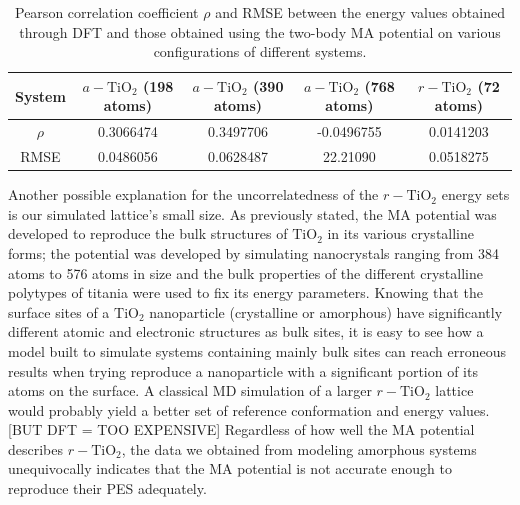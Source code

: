 \documentclass[aps,prb,twocolumn,amsmath,amssymb,superscriptaddress,longbibliography]{revtex4-1}
\newcommand\tab[1][1cm]{\hspace*{#1}} %
\begin{document}
\begin{table}[]
\begin{tabular}{c|c|c|c|c}
System & $a-\text{TiO}_2$ (198 atoms) & $a-\text{TiO}_2$ (390 atoms) & $a-\text{TiO}_2$ (768 atoms)  & $r-\text{TiO}_2$ (72 atoms) \\ \hline
$\rho$ & 0.3066474                    & 0.3497706                    & -0.0496755                   & 0.0141203                   \\
RMSE   & 0.0486056                    & 0.0628487                    & 22.21090                       & 0.0518275                   \\
\end{tabular}
\label{stats}
\caption{Pearson correlation coefficient $\rho$ and RMSE between the energy values obtained through DFT and those obtained using the two-body MA potential on various configurations of different systems.}
\end{table}

\tab Another possible explanation for the uncorrelatedness of the $r-\text{TiO}_2$ energy sets is our simulated lattice's small size.
As previously stated, the MA potential was developed to reproduce the bulk structures of $\text{TiO}_2$ in its various crystalline forms; the potential was developed by simulating nanocrystals ranging from 384 atoms to 576 atoms in size and the bulk properties of the different crystalline polytypes of titania were used to fix its energy parameters.
Knowing that the surface sites of a $\text{TiO}_2$ nanoparticle (crystalline or amorphous) have significantly different atomic and electronic structures as bulk sites\cite{vvh1,realistic_nnp,vvh2}, it is easy to see how a model built to simulate systems containing mainly bulk sites can reach erroneous results when trying reproduce a nanoparticle with a significant portion of its atoms on the surface.
A classical MD simulation of a larger $r-\text{TiO}_2$ lattice would probably yield a better set of reference conformation and energy values.
[BUT DFT = TOO EXPENSIVE]
Regardless of how well the MA potential describes $r-\text{TiO}_2$, the data we obtained from modeling amorphous systems unequivocally indicates that the MA potential is not accurate enough to reproduce their PES adequately. 
\end{document}
